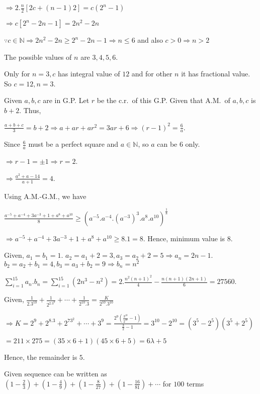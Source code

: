   $\Rightarrow 2.\frac{n}{2}[2c + (n - 1)2] = c\left(2^n- 1\right)$

  $\Rightarrow c\left[2^n - 2n - 1\right] = 2n^2 - 2n$

  $\because c\in\mathbb{N}\Rightarrow 2n^2 - 2n \geq 2^n - 2n - 1\Rightarrow n\leq 6$ and also $c >
  0\Rightarrow n > 2$

  The possible values of $n$ are $3, 4, 5, 6$.

  Only for $n = 3, c$ has integral value of $12$ and for other $n$ it has fractional value. So $c =12, n =
  3$.
\item Given $a, b, c$ are in G.P. Let $r$ be the c.r.\ of this G.P. Given that A.M.\ of $a, b, c$ is $b +
  2$. Thus,

  $\frac{a + b + c}{3} = b + 2 \Rightarrow a + ar + ar^2 = 3ar + 6 \Rightarrow (r - 1)^2 = \frac{6}{a}$.

  Since $\frac{6}{a}$ must be a perfect square and $a\in\mathbb{N}$, so $a$ can be $6$ only.

  $\Rightarrow r - 1 = \pm 1\Rightarrow r = 2$.

  $\Rightarrow \frac{a^2 + a - 14}{a + 1} = 4$.
\item Using A.M.-G.M., we have

  $\frac{a^{-5} + a^{-4} + 3a^{-3} + 1 + a^8 + a^{10}}{8}\geq
  \left(a^{-5}.a^{-4}.(a^{-3})^3.a^8.a^{10}\right)^{\frac{1}{8}}$

  $\Rightarrow a^{-5} + a^{-4} + 3a^{-3} + 1 + a^8 + a^{10}\geq 8.1 = 8$. Hence, minimum value is $8$.
\item Given, $a_1 = b_1 = 1$. $a_2 = a_1 + 2 = 3, a_3 = a_2 + 2 = 5\Rightarrow a_n = 2n - 1$. $b_2 = a_2 +
  b_1 = 4, b_3 = a_3 + b_2 = 9\Rightarrow b_n = n^2$

  $\displaystyle\sum_{i = 1}^{15}a_n.b_n = \sum_{i = 1}^{15}\left(2n^3 - n^2\right) = 2.\frac{n^2(n +
    1)^2}{4} - \frac{n(n + 1)(2n + 1)}{6} = 27560$.
\item Given, $\frac{1}{2.3^{10}} + \frac{1}{2^2.3^9} + \cdots + \frac{1}{2^{10}.3} =
  \frac{K}{2^{10}.3^{10}}$

  $\Rightarrow K = 2^9 + 2^8.3 + 2^73^2 + \cdots + 3^9 = \frac{2^9\left(\frac{3^{10}}{2^{10}} -
    1\right)}{\frac{3}{2} - 1} = 3^{10} - 2^{10} = \left(3^5 - 2^5\right)\left(3^5 + 2^5\right)$

  $= 211\times275 = (35\times6 + 1)(45\times6 + 5) = 6\lambda + 5$

  Hence, the remainder is $5$.
\item Given sequence can be written as $\left(1 - \frac{2}{3}\right) + \left(1 - \frac{4}{9}\right) +
  \left(1 - \frac{8}{27}\right) + \left(1 - \frac{16}{81}\right) + \cdots$ for $100$ terms


